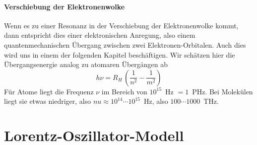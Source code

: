 \paragraph{Verschiebung der Elektronenwolke} Wenn es zu einer Resonanz in der Verschiebung der Elektronenwolke kommt, dann entspricht dies einer elektronischen Anregung, also einem quantenmechanischen Übergang zwischen zwei Elektronen-Orbitalen. Auch dies wird uns in einem der folgenden Kapitel beschäftigen. Wir schätzen hier die Übergangsenergie analog zu atomaren Übergängen ab
\begin{equation}
  h \nu = R_H \, \left( \frac{1}{n^2} - \frac{1}{m^2} \right)
\end{equation}
Für Atome liegt die Frequenz $\nu$ im Bereich von $10^{15}$~Hz $= 1$~PHz. Bei Molekülen liegt sie etwas niedriger, also $nu \approx 10^{14} \cdots 10^{15}$~Hz, also $100 \cdots 1000$~THz.


\section{Lorentz-Oszillator-Modell}

